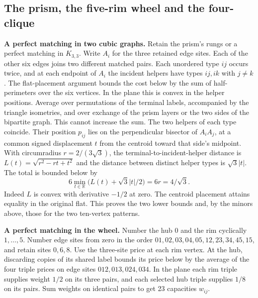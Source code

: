 \documentclass[11pt,letterpaper]{article}
\begin{document}
\subsection{The prism, the five-rim wheel and the four-clique}\label{the-prism-the-five-rim-wheel-and-the-four-clique}

\textbf{A perfect matching in two cubic graphs.} Retain the prism's rungs or a perfect matching in \(K_{3,3}\). Write \(A_i\) for the three retained edge sites. Each of the other six edges joins two different matched pairs. Each unordered type \(ij\) occurs twice, and at each endpoint of \(A_i\) the incident helpers have types \(ij,ik\) with \(j\ne k\). The flat-placement argument bounds the cost below by the sum of half-perimeters over the six vertices. In the plane this is convex in the helper positions. Average over permutations of the terminal labels, accompanied by the triangle isometries, and over exchange of the prism layers or the two sides of the bipartite graph. This cannot increase the sum. The two helpers of each type coincide. Their position \(p_{ij}\) lies on the perpendicular bisector of \(A_iA_j\), at a common signed displacement \(t\) from the centroid toward that side's midpoint. With circumradius \(r=2/(3\sqrt3)\), the terminal-to-incident-helper distance is \(L(t)=\sqrt{r^2-rt+t^2}\) and the distance between distinct helper types is \(\sqrt3|t|\). The total is bounded below by
\[
                  6\min_{t\in\mathbb R}\big(L(t)+\sqrt3|t|/2\big)=6r=4/\sqrt3.
\]
Indeed \(L\) is convex with derivative \(-1/2\) at zero. The centroid placement attains equality in the original flat. This proves the two lower bounds and, by the minors above, those for the two ten-vertex patterns.

\textbf{A perfect matching in the wheel.} Number the hub \(0\) and the rim cyclically \(1,\ldots,5\). Number edge sites from zero in the order \(01,02,03,04,05,12,23,34,45,15\), and retain sites \(0,6,8\). Use the three-site price at each rim vertex. At the hub, discarding copies of its shared label bounds its price below by the average of the four triple prices on edge sites \(012,013,024,034\). In the plane each rim triple supplies weight \(1/2\) on its three pairs, and each selected hub triple supplies \(1/8\) on its pairs. Sum weights on identical pairs to get 23 capacities \(w_{ij}\).
\end{document}

